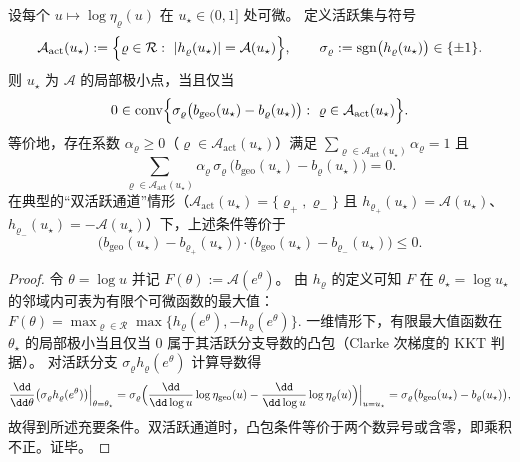 \begin{theorem}\label{thm:gut-A-local-optimality}
设每个 \(u\mapsto \log\eta_\varrho(u)\) 在 \(u_\star\in(0,1]\) 处可微。
定义活跃集与符号
\[
\mathcal{A}_{\mathrm{act}}(u_\star):=\Bigl\{\varrho\in\mathcal{R}:\ |h_\varrho(u_\star)|=\mathcal{A}(u_\star)\Bigr\},
\qquad
\sigma_\varrho:=\operatorname{sgn}\bigl(h_\varrho(u_\star)\bigr)\in\{\pm 1\}.
\]
则 \(u_\star\) 为 \(\mathcal{A}\) 的局部极小点，当且仅当
\[
0\in
\operatorname{conv}\Bigl\{\sigma_\varrho\bigl(b_{\mathrm{geo}}(u_\star)-b_\varrho(u_\star)\bigr):\ \varrho\in\mathcal{A}_{\mathrm{act}}(u_\star)\Bigr\}.
\]
等价地，存在系数 \(\alpha_\varrho\ge 0\)（\(\varrho\in\mathcal{A}_{\mathrm{act}}(u_\star)\)）满足
\(
\sum_{\varrho\in\mathcal{A}_{\mathrm{act}}(u_\star)}\alpha_\varrho=1
\)
且
\[
\sum_{\varrho\in\mathcal{A}_{\mathrm{act}}(u_\star)}
\alpha_\varrho\,\sigma_\varrho\,\bigl(b_{\mathrm{geo}}(u_\star)-b_\varrho(u_\star)\bigr)=0.
\]
在典型的“双活跃通道”情形（\(\mathcal{A}_{\mathrm{act}}(u_\star)=\{\varrho_+,\varrho_-\}\) 且 \(h_{\varrho_+}(u_\star)=\mathcal{A}(u_\star)\)、\(h_{\varrho_-}(u_\star)=-\mathcal{A}(u_\star)\)）下，上述条件等价于
\[
\bigl(b_{\mathrm{geo}}(u_\star)-b_{\varrho_+}(u_\star)\bigr)\cdot
\bigl(b_{\mathrm{geo}}(u_\star)-b_{\varrho_-}(u_\star)\bigr)\le 0.
\]
\end{theorem}

\begin{proof}
令 \(\theta=\log u\) 并记 \(F(\theta):=\mathcal{A}(e^\theta)\)。
由 \(h_\varrho\) 的定义可知 \(F\) 在 \(\theta_\star=\log u_\star\) 的邻域内可表为有限个可微函数的最大值：
\(
F(\theta)=\max_{\varrho\in\mathcal{R}}\max\{h_\varrho(e^\theta),-h_\varrho(e^\theta)\}.
\)
一维情形下，有限最大值函数在 \(\theta_\star\) 的局部极小当且仅当 \(0\) 属于其活跃分支导数的凸包（Clarke 次梯度的 KKT 判据）。
对活跃分支 \(\sigma_\varrho h_\varrho(e^\theta)\) 计算导数得
\[
\frac{\dd}{\dd\theta}\bigl(\sigma_\varrho h_\varrho(e^\theta)\bigr)\Big|_{\theta=\theta_\star}
=\sigma_\varrho\Bigl(\frac{\dd}{\dd\log u}\log\eta_{\mathrm{geo}}(u)-\frac{\dd}{\dd\log u}\log\eta_\varrho(u)\Bigr)\Big|_{u=u_\star}
=\sigma_\varrho\bigl(b_{\mathrm{geo}}(u_\star)-b_\varrho(u_\star)\bigr),
\]
故得到所述充要条件。双活跃通道时，凸包条件等价于两个数异号或含零，即乘积不正。证毕。
\end{proof}

